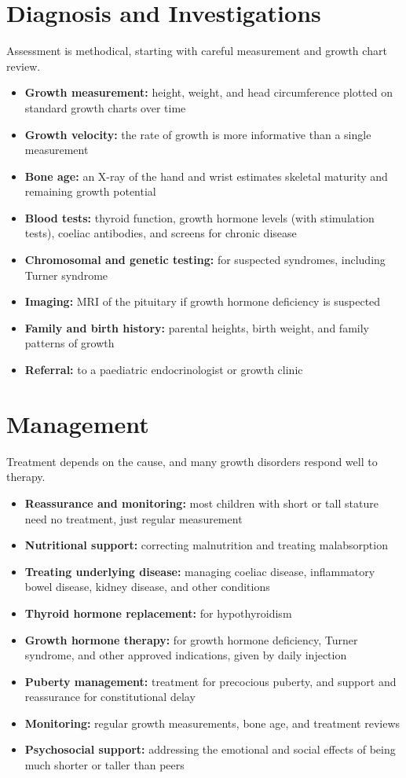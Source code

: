 \section*{Diagnosis and Investigations}
Assessment is methodical, starting with careful measurement and growth chart review.

\begin{itemize}
    \item \textbf{Growth measurement:} height, weight, and head circumference plotted on standard growth charts over time
    \item \textbf{Growth velocity:} the rate of growth is more informative than a single measurement
    \item \textbf{Bone age:} an X-ray of the hand and wrist estimates skeletal maturity and remaining growth potential
    \item \textbf{Blood tests:} thyroid function, growth hormone levels (with stimulation tests), coeliac antibodies, and screens for chronic disease
    \item \textbf{Chromosomal and genetic testing:} for suspected syndromes, including Turner syndrome
    \item \textbf{Imaging:} MRI of the pituitary if growth hormone deficiency is suspected
    \item \textbf{Family and birth history:} parental heights, birth weight, and family patterns of growth
    \item \textbf{Referral:} to a paediatric endocrinologist or growth clinic
\end{itemize}

\section*{Management}
Treatment depends on the cause, and many growth disorders respond well to therapy.

\begin{itemize}
    \item \textbf{Reassurance and monitoring:} most children with short or tall stature need no treatment, just regular measurement
    \item \textbf{Nutritional support:} correcting malnutrition and treating malabsorption
    \item \textbf{Treating underlying disease:} managing coeliac disease, inflammatory bowel disease, kidney disease, and other conditions
    \item \textbf{Thyroid hormone replacement:} for hypothyroidism
    \item \textbf{Growth hormone therapy:} for growth hormone deficiency, Turner syndrome, and other approved indications, given by daily injection
    \item \textbf{Puberty management:} treatment for precocious puberty, and support and reassurance for constitutional delay
    \item \textbf{Monitoring:} regular growth measurements, bone age, and treatment reviews
    \item \textbf{Psychosocial support:} addressing the emotional and social effects of being much shorter or taller than peers
\end{itemize}

